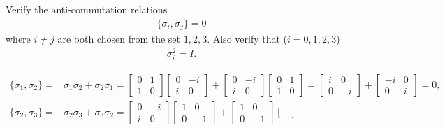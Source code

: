 \documentclass[en]{sol-man}
\begin{document}
\begin{exe}
    Verify the anti-commutation relations
    \begin{align}
        \{\sigma_i,\sigma_j\}=0
    \end{align}
    where $i\neq j$ are both chosen from the set $1,2,3$. Also verify that ($i=0,1,2,3$)
    \begin{align}
        \sigma_i^2=I.
    \end{align}
\end{exe}
\begin{pf}
    \begin{align}
        \{\sigma_1,\sigma_2\}=&\sigma_1\sigma_2+\sigma_2\sigma_1=\begin{bmatrix}
            0&1\\
            1&0
        \end{bmatrix}\begin{bmatrix}
            0&-i\\
            i&0
        \end{bmatrix}+\begin{bmatrix}
            0&-i\\
            i&0
        \end{bmatrix}\begin{bmatrix}
            0&1\\
            1&0
        \end{bmatrix}=\begin{bmatrix}
            i&0\\
            0&-i
        \end{bmatrix}+\begin{bmatrix}
            -i&0\\
            0&i
        \end{bmatrix}=0,\\
        \{\sigma_2,\sigma_3\}=&\sigma_2\sigma_3+\sigma_3\sigma_2=\begin{bmatrix}
            0&-i\\
            i&0
        \end{bmatrix}\begin{bmatrix}
            1&0\\
            0&-1
        \end{bmatrix}+\begin{bmatrix}
            1&0\\
            0&-1
        \end{bmatrix}\begin{bmatrix}

\end{bmatrix}
\end{align}
\end{pf}
\end{document}
